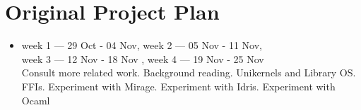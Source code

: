 
\section{Original Project Plan}\label{ch:origplan}
\begin{itemize}

    \item week 1 --- 29 Oct - 04 Nov,
          week 2 --- 05 Nov - 11 Nov, \\
          week 3 --- 12 Nov - 18 Nov ,
          week 4 --- 19 Nov - 25 Nov \\
          Consult more related work.
          Background reading.
          Unikernels and Library OS. \\
          FFIs.
          Experiment with Mirage.
          Experiment with Idris.
          Experiment with Ocaml


\end{itemize}
